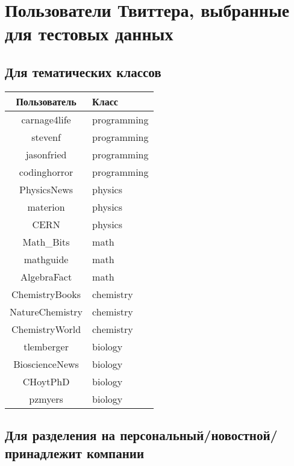 \appendix
\chapter{Пользователи Твиттера, выбранные для тестовых данных}
\section{Для тематических классов}

\label{table:thematic}
\begin{tabular}[t]{|c|l|}
\hline
Пользователь & Класс \\
\hline
carnage4life & programming \\
\hline
stevenf & programming \\
\hline
jasonfried & programming \\
\hline
codinghorror & programming \\
\hline
PhysicsNews & physics \\
\hline
materion & physics \\
\hline
CERN & physics \\
\hline
Math\_Bits & math \\
\hline
mathguide & math \\
\hline
AlgebraFact & math \\
\hline
ChemistryBooks & chemistry \\
\hline
NatureChemistry & chemistry \\
\hline
ChemistryWorld & chemistry \\
\hline
tlemberger & biology \\
\hline
BioscienceNews & biology \\
\hline
CHoytPhD & biology \\
\hline
pzmyers & biology \\
\hline
\end{tabular}

\section{Для разделения на персональный/новостной/принадлежит компании}

